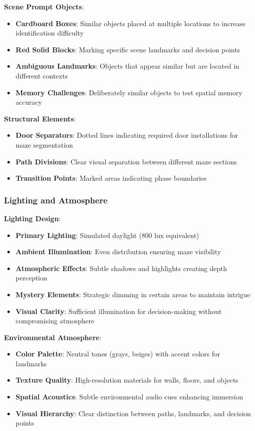 \documentclass[12pt]{article}
\begin{document}
\textbf{Scene Prompt Objects}:
\begin{itemize}
    \item \textbf{Cardboard Boxes}: Similar objects placed at multiple locations to increase identification difficulty
    \item \textbf{Red Solid Blocks}: Marking specific scene landmarks and decision points
    \item \textbf{Ambiguous Landmarks}: Objects that appear similar but are located in different contexts
    \item \textbf{Memory Challenges}: Deliberately similar objects to test spatial memory accuracy
\end{itemize}

\textbf{Structural Elements}:
\begin{itemize}
    \item \textbf{Door Separators}: Dotted lines indicating required door installations for maze segmentation
    \item \textbf{Path Divisions}: Clear visual separation between different maze sections
    \item \textbf{Transition Points}: Marked areas indicating phase boundaries
\end{itemize}

\subsubsection{Lighting and Atmosphere}

\textbf{Lighting Design}:
\begin{itemize}
    \item \textbf{Primary Lighting}: Simulated daylight (800 lux equivalent)
    \item \textbf{Ambient Illumination}: Even distribution ensuring maze visibility
    \item \textbf{Atmospheric Effects}: Subtle shadows and highlights creating depth perception
    \item \textbf{Mystery Elements}: Strategic dimming in certain areas to maintain intrigue
    \item \textbf{Visual Clarity}: Sufficient illumination for decision-making without compromising atmosphere
\end{itemize}

\textbf{Environmental Atmosphere}:
\begin{itemize}
    \item \textbf{Color Palette}: Neutral tones (grays, beiges) with accent colors for landmarks
    \item \textbf{Texture Quality}: High-resolution materials for walls, floors, and objects
    \item \textbf{Spatial Acoustics}: Subtle environmental audio cues enhancing immersion
    \item \textbf{Visual Hierarchy}: Clear distinction between paths, landmarks, and decision points
\end{itemize}
\end{document}

